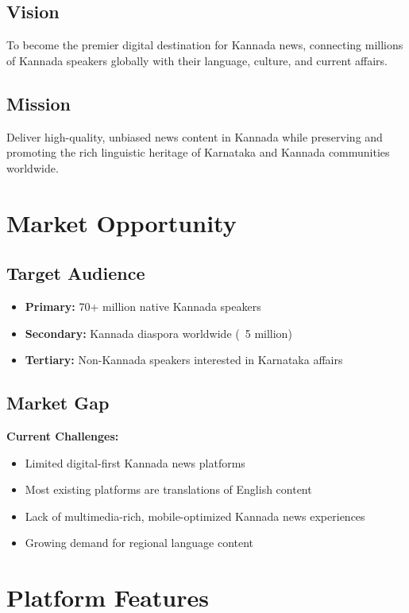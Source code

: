\documentclass[11pt,a4paper]{article}
\begin{document}
\subsection{Vision}
To become the premier digital destination for Kannada news, connecting millions of Kannada speakers globally with their language, culture, and current affairs.

\subsection{Mission}
Deliver high-quality, unbiased news content in Kannada while preserving and promoting the rich linguistic heritage of Karnataka and Kannada communities worldwide.

\section{Market Opportunity}

\subsection{Target Audience}
\begin{itemize}[leftmargin=2em]
    \item \textbf{Primary:} 70+ million native Kannada speakers
    \item \textbf{Secondary:} Kannada diaspora worldwide (~5 million)
    \item \textbf{Tertiary:} Non-Kannada speakers interested in Karnataka affairs
\end{itemize}

\subsection{Market Gap}
\begin{warning}
\textbf{Current Challenges:}
\begin{itemize}
    \item Limited digital-first Kannada news platforms
    \item Most existing platforms are translations of English content
    \item Lack of multimedia-rich, mobile-optimized Kannada news experiences
    \item Growing demand for regional language content
\end{itemize}
\end{warning}

\section{Platform Features}
\end{document}
